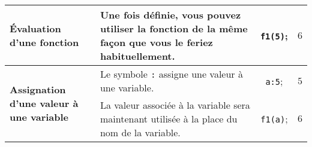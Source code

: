 \documentclass[landscape]{article}
\begin{document}
\begin{center}
\begin{longtable}{@{}p{4cm}p{12cm}cc@{}}
\midrule

\textbf{Évaluation d'une fonction} & Une fois définie, vous pouvez utiliser la fonction de la même façon que vous le feriez habituellement. &
\texttt{f1(5)}; & $6$ \\

\midrule

\multirow{2}{*}{\textbf{Assignation d'une valeur à une variable}} & Le symbole \texttt{:} assigne une valeur à une variable. & \texttt{a:5}; & $5$ \\
& La valeur associée à la variable sera maintenant utilisée à la place du nom de la variable. & \texttt{f1(a)}; & $6$ \\

\bottomrule
\end{longtable}
\end{center}
\end{document}
